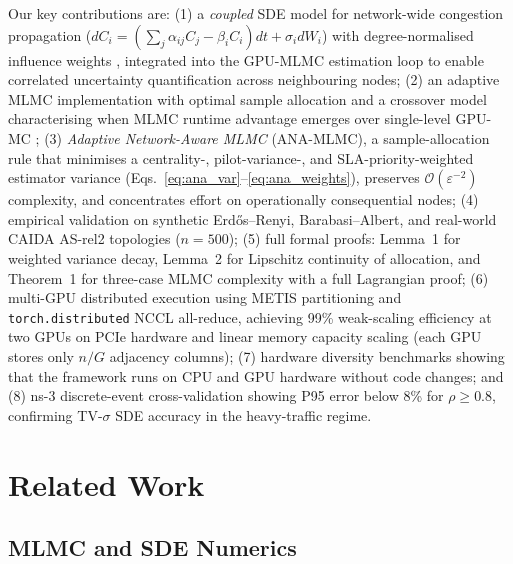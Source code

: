 \documentclass[journal]{IEEEtran}
\begin{document}
Our key contributions are:
(1) a \emph{coupled} SDE model for network-wide congestion propagation
($dC_i = (\sum_j \alpha_{ij}C_j - \beta_i C_i)dt + \sigma_i dW_i$) with degree-normalised
influence weights \cite{kang2007,harrison1985}, integrated into the GPU-MLMC estimation loop
to enable correlated uncertainty quantification across neighbouring nodes;
(2) an adaptive MLMC implementation with optimal sample allocation and a crossover model
characterising when MLMC runtime advantage emerges over single-level GPU-MC
\cite{giles2015multilevel,collier2015};
(3) \emph{Adaptive Network-Aware MLMC} (ANA-MLMC), a sample-allocation rule that minimises a
centrality-, pilot-variance-, and SLA-priority-weighted estimator variance
(Eqs.~\eqref{eq:ana_var}--\eqref{eq:ana_weights}), preserves
$\mathcal{O}(\varepsilon^{-2})$ complexity, and concentrates effort on operationally
consequential nodes;
(4) empirical validation on synthetic Erd\H{o}s--Renyi, Barabasi--Albert, and real-world
CAIDA AS-rel2 topologies ($n=500$);
(5) full formal proofs: Lemma~1 for weighted variance decay, Lemma~2 for Lipschitz continuity
of allocation, and Theorem~1 for three-case MLMC complexity with a full Lagrangian proof;
(6) multi-GPU distributed execution using METIS partitioning and \texttt{torch.distributed}
NCCL all-reduce, achieving 99\% weak-scaling efficiency at two GPUs on PCIe hardware and
linear memory capacity scaling (each GPU stores only $n/G$ adjacency columns);
(7) hardware diversity benchmarks showing that the framework runs on CPU and GPU hardware
without code changes; and
(8) ns-3 discrete-event cross-validation showing P95 error below 8\% for $\rho \geq 0.8$,
confirming TV-$\sigma$ SDE accuracy in the heavy-traffic regime.

\section{Related Work}

\subsection{MLMC and SDE Numerics}
\end{document}
